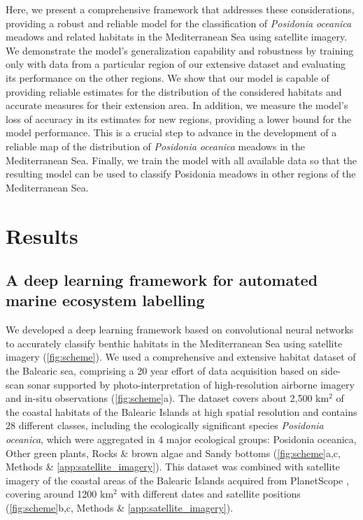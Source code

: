 Here, we present a comprehensive framework that addresses these considerations,
providing a robust and reliable model for the classification of
\textit{Posidonia
    oceanica} meadows and related habitats in the Mediterranean Sea using
satellite imagery. We demonstrate the model's generalization capability and
robustness by training only with data from a particular region of our extensive
dataset and evaluating its performance on the other regions. We show that our
model is capable of providing reliable estimates for the distribution of the
considered habitats and accurate measures for their extension area. In
addition, we measure the model's loss of accuracy in its estimates for new
regions, providing a lower bound for the model performance. This is a
crucial step to advance in the development of a reliable map of the
distribution of \textit{Posidonia oceanica} meadows in the Mediterranean Sea.
Finally, we train the model with all available data so that the resulting
model can be used to classify Posidonia meadows in other regions of the
Mediterranean Sea.

\section{Results}

\subsection{A deep learning framework for automated marine ecosystem
    labelling}

We developed a deep learning framework based on convolutional neural networks
to accurately classify benthic habitats in the Mediterranean Sea using
satellite imagery (\cref{fig:scheme}). We used a comprehensive and extensive
habitat dataset of the Balearic sea, comprising a 20 year effort of data
acquisition based on side-scan sonar supported by photo-interpretation of
high-resolution airborne imagery and in-situ observations (\cref{fig:scheme}a).
The dataset covers  about 2,500 km$^2$ of the coastal habitats of the Balearic
Islands at high spatial resolution and contains 28 different classes,
including the ecologically significant species \textit{Posidonia
    oceanica}, which were
aggregated in 4 major ecological groups: Posidonia oceanica, Other
green plants, Rocks \& brown algae and Sandy bottoms
(\cref{fig:scheme}a,c, Methods \&  \cref{app:satellite_imagery}). This
dataset was
combined with satellite imagery of the coastal areas of the Balearic Islands
acquired from PlanetScope \cite{planet2017}, covering around 1200 km$^2$ with
different dates and
satellite positions (\cref{fig:scheme}b,c, Methods \&
\cref{app:satellite_imagery}).

